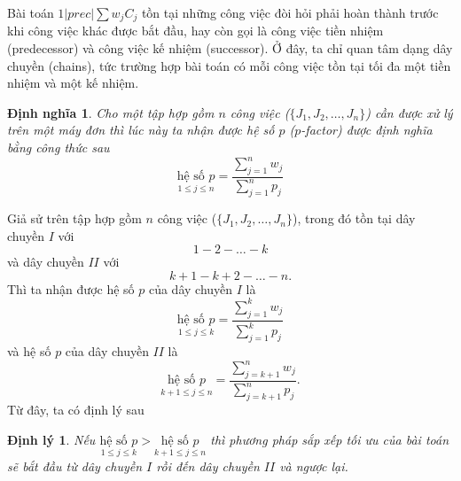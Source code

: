\documentclass[12pt,a4paper]{report}
\newtheorem{dn}{Định nghĩa}
\newtheorem{dl}{Định lý}
\begin{document}
Bài toán $1|prec|\sum w_j C_j$ tồn tại những công việc đòi hỏi phải hoàn thành trước khi công việc khác được bắt đầu, hay còn gọi là công việc tiền nhiệm (predecessor) và công việc kế nhiệm (successor). Ở đây, ta chỉ quan tâm dạng dây chuyền (chains), tức trường hợp bài toán có mỗi công việc tồn tại tối đa một tiền nhiệm và một kế nhiệm.

\begin{dn}
Cho một tập hợp gồm $n$ công việc ($\{J_1, J_2, …, J_n\}$) cần được xử lý trên một máy đơn thì lúc này ta nhận được hệ số $p$ ($p$-factor) được định nghĩa bằng công thức sau
\begin{equation}
	\underset{1 \leq j \leq n}{\text{hệ số }p} = \frac{\sum_{j=1}^n w_j}{\sum_{j=1}^n p_j}
\end{equation}
\end{dn}

Giả sử trên tập hợp gồm $n$ công việc ($\{J_1, J_2, …, J_n\}$), trong đó tồn tại dây chuyền $I$ với
\begin{equation*}
1 - 2 - \ldots - k
\end{equation*}
và dây chuyền $II$ với
\begin{equation*}
k+1 - k+2 - \ldots - n.
\end{equation*}
Thì ta nhận được hệ số $p$ của dây chuyền $I$ là
\begin{equation}
	\underset{1 \leq j \leq k}{\text{hệ số }p} = \frac{\sum_{j=1}^k w_j}{\sum_{j=1}^k p_j}
\end{equation}
và hệ số $p$ của dây chuyền $II$ là
\begin{equation}
	\underset{k+1 \leq j \leq n}{\text{hệ số }p} = \frac{\sum_{j=k+1}^n w_j}{\sum_{j=k+1}^n p_j}.
\end{equation}
Từ đây, ta có định lý sau
\begin{dl} \label{daychuyen}
	Nếu $\underset{1 \leq j \leq k}{\text{hệ số }p} > \underset{k+1 \leq j \leq n}{\text{hệ số }p}$ thì phương pháp sắp xếp tối ưu của bài toán sẽ bắt đầu từ dây chuyền $I$ rồi đến dây chuyền $II$ và ngược lại.
\end{dl}
\end{document}
